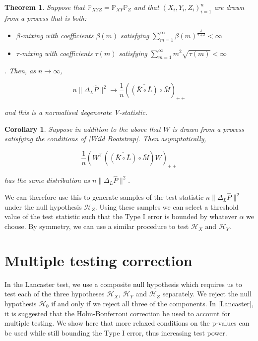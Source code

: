 \documentclass{article}
\newtheorem{theorem}{Theorem}
\newtheorem{corollary}{Corollary}
\begin{document}
\begin{theorem}\label{theorem:lancasterAsymptote}
Suppose that $\mathbb{P}_{XYZ} = \mathbb{P}_{XY}\mathbb{P}_Z$ and that $(X_i,Y_i,Z_i)_{i=1}^n$ are drawn from a process that is both:

\begin{itemize}
\item $\beta$-mixing with coefficients $\beta(m)$ satisfying $\sum_{m=1}^{\infty}\beta(m)^{\frac{\delta}{2+\delta}}<\infty$
\item $\tau$-mixing with coefficients $\tau(m)$ satisfying $\sum_{m=1}^\infty m^2 \sqrt{\tau(m)} < \infty$
\end{itemize} . Then, as $n\longrightarrow \infty$, 

\[ n\| \Delta_L\hat{P} \|^2 \longrightarrow \frac{1}{n}\left( \overline{\left( \bar{K} \circ \bar{L}\right) }\circ \bar{M} \right) _{++} \]

and this is a normalised degenerate V-statistic.
\end{theorem}

\begin{corollary}
Suppose in addition to the above that $W$ is drawn from a process satisfying the conditions of [Wild Bootstrap]. Then asymptotically,

\[\frac{1}{n}\left(W^\intercal\left( \overline{\left( \bar{K} \circ \bar{L}\right) }\circ \bar{M} \right)W\right) _{++}\]

has the same distribution as $ n\| \Delta_L\hat{P} \|^2$. 
\end{corollary}

We can therefore use this to generate samples of the test statistic $ n\| \Delta_L\hat{P} \|^2$ under the null hypothesis $\mathcal{H}_Z$. Using these samples we can select a threshold value of the test statistic such that the Type I error is bounded by whatever $\alpha$ we choose. By symmetry, we can use a similar procedure to test $\mathcal{H}_X$ and $\mathcal{H}_Y$.

\section{Multiple testing correction}
In the Lancaster test, we use a composite null hypothesis which requires us to test each of the three hypotheses $\mathcal{H}_X$, $\mathcal{H}_Y$ and $\mathcal{H}_Z$ separately. We reject the null hypothesis $\mathcal{H}_0$ if and only if we reject all three of the components. In [Lancaster], it is suggested that the Holm-Bonferroni correction be used to account for multiple testing. We show here that more relaxed conditions on the p-values can be used while still bounding the Type I error, thus increasing test power.
\end{document}
